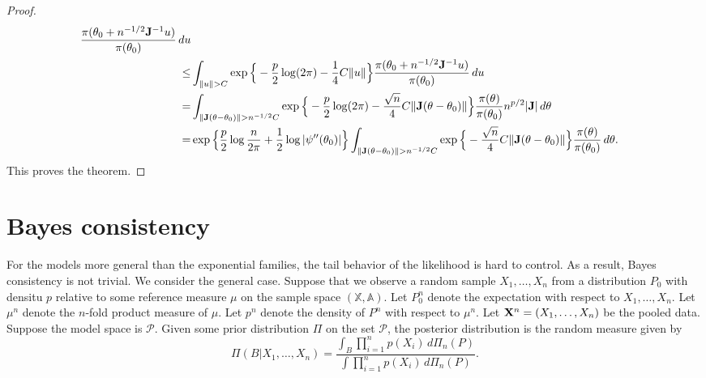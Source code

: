 \documentclass[11pt, letterpaper]{article}
\theoremstyle{plain}
\theoremstyle{definition}
\theoremstyle{remark}
\begin{document}
\begin{proof}
$$\begin{aligned}
\frac{\pi(\theta_0+n^{-1/2} \BJ^{-1}u)}{\pi(\theta_0)}\, du
\\
    \leq & 
    \int_{\|u\|> C}
\exp\Big\{
-\frac{p}{2}\log (2\pi)
    -\frac{1}{4} C\|u\|
    \Big\}
\frac{\pi(\theta_0+n^{-1/2} \BJ^{-1}u)}{\pi(\theta_0)}\, du\\
    = & 
    \int_{\|\BJ(\theta-\theta_0)\|>n^{-1/2} C}
\exp\Big\{
-\frac{p}{2}\log (2\pi)
    -\frac{\sqrt{n}}{4} C\|\BJ(\theta-\theta_0)\|
    \Big\}
\frac{\pi(\theta)}{\pi(\theta_0)} n^{p/2} |\BJ| \, d\theta\\
    = & 
\exp\Big\{
    \frac{p}{2}\log \frac{n}{2\pi}
    +\frac{1}{2}\log |\psi''(\theta_0)|
    \Big\}
    \int_{\|\BJ(\theta-\theta_0)\|>n^{-1/2} C}
    \exp\Big\{
    -\frac{\sqrt{n}}{4} C\|\BJ(\theta-\theta_0)\|
    \Big\}
\frac{\pi(\theta)}{\pi(\theta_0)} \, d\theta.
\end{aligned}
$$
This proves the theorem.
\end{proof}


\section{Bayes consistency}
For the models more general than the exponential families, the tail behavior of the likelihood is hard to control.
As a result, Bayes consistency is not trivial.
We consider the general case.
Suppose that we observe a random sample $X_1,\ldots, X_n$ from a distribution $P_0$ with densitu $p$ relative to some reference measure $\mu$ on the sample space $(\mathbb{X},\mathbb{A})$. 
Let $P_0^n$ denote the expectation with respect to $X_1,\ldots, X_n$. 
Let $\mu^n$ denote the $n$-fold product measure of $\mu$.
Let $p^n$ denote the density of $P^n$ with respect to $\mu^n$.
Let $\mathbf{X}^n=(X_1,\ldots, X_n)$ be the pooled data.
Suppose the model space is $\mathcal{P}$.
Given some prior distribution $\Pi$ on the set $\mathcal{P}$, the posterior distribution is the random measure given by
\begin{equation}\label{eq:BayesFormula}
\Pi(B|X_1,\ldots, X_n)=\frac{
    \int_B \prod_{i=1}^n p(X_i) \, d \Pi_n(P)
}{
    \int \prod_{i=1}^n p(X_i) \, d \Pi_n(P)
}.
\end{equation}
\end{document}
